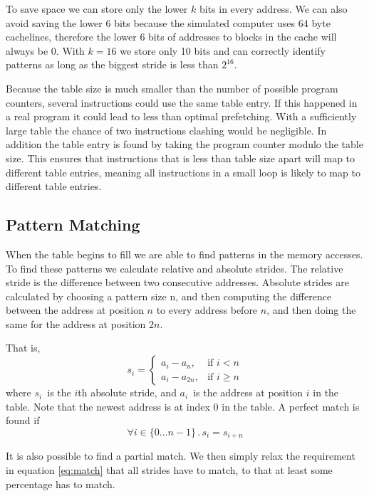 To save space we can store only the lower $k$ bits in every address. We can
also avoid saving the lower 6 bits because the simulated computer uses 64 byte
cachelines, therefore the lower 6 bits of addresses to blocks in the cache will
always be 0. With $k=16$ we store only 10 bits and can correctly identify
patterns as long as the biggest stride is less than $2^{16}$.

Because the table size is much smaller
than the number of possible program counters, several instructions could use
the same table entry. If this happened in a real program it could lead to less
than optimal prefetching. With a sufficiently large table the chance of two
instructions clashing would be negligible. In addition the table entry is found
by taking the program counter modulo the table size. This ensures that
instructions that is less than table size apart will map to different table
entries, meaning all instructions in a small loop is likely to map to different
table entries.

\subsection{Pattern Matching}

When the table begins to fill we are able to find patterns in the memory accesses.
To find these patterns we calculate relative and absolute strides.
The relative stride is the difference between two consecutive
addresses. Absolute strides are calculated by choosing a pattern size n,
and then computing the difference between the address at position
$n$ to every address before $n$, and then doing the same for the address
at position $2n$.

That is,
\[
	s_i = \begin{cases}
		a_i - a_n,    & \text{if } i  < n \\%
		a_i - a_{2n}, & \text{if } i \geq n %
	\end{cases}
\]
where $s_i$~is the $i$th absolute stride, and $a_i$~is the address at position
$i$ in the table. Note that the newest address is at index 0 in the table. A
perfect match is found if
\begin{equation}
\label{eq:match}
\forall i \in \{0 \dots n - 1\} \,.\, s_i = s_{i + n}
\end{equation}

It is also possible to find a partial match. We then simply relax the
requirement in equation \eqref{eq:match} that all strides have to match, to
that at least some percentage has to match.

